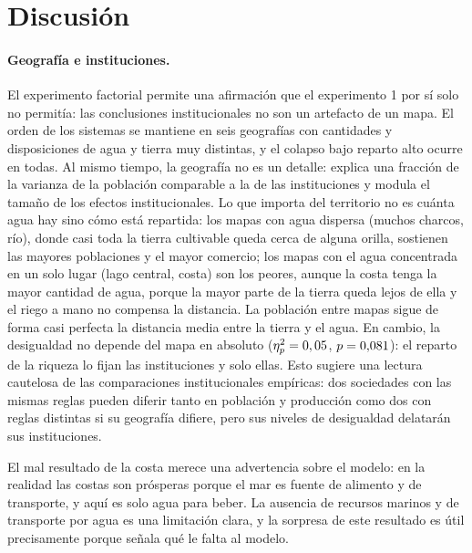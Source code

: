 \documentclass[11pt,a4paper]{article}
\begin{document}
\begin{table}[htbp]\centering\small
\caption{Contrastes clave repetidos en cada mapa ($d$ de Cohen y prueba t de Welch, \nRepMapas{} réplicas por sistema y mapa).}\label{tab:contrastes-mapas}
\resizebox{\textwidth}{!}{}
\end{table}

\section{Discusión}
\paragraph{Geografía e instituciones.} El experimento factorial permite una afirmación que el experimento 1 por sí solo no permitía: las conclusiones institucionales no son un artefacto de un mapa. El orden de los sistemas se mantiene en seis geografías con cantidades y disposiciones de agua y tierra muy distintas, y el colapso bajo reparto alto ocurre en todas. Al mismo tiempo, la geografía no es un detalle: explica una fracción de la varianza de la población comparable a la de las instituciones y modula el tamaño de los efectos institucionales. Lo que importa del territorio no es cuánta agua hay sino cómo está repartida: los mapas con agua dispersa (muchos charcos, río), donde casi toda la tierra cultivable queda cerca de alguna orilla, sostienen las mayores poblaciones y el mayor comercio; los mapas con el agua concentrada en un solo lugar (lago central, costa) son los peores, aunque la costa tenga la mayor cantidad de agua, porque la mayor parte de la tierra queda lejos de ella y el riego a mano no compensa la distancia. La población entre mapas sigue de forma casi perfecta la distancia media entre la tierra y el agua. En cambio, la desigualdad no depende del mapa en absoluto ($\eta^2_p=0,05$, $p=0{,}081$): el reparto de la riqueza lo fijan las instituciones y solo ellas. Esto sugiere una lectura cautelosa de las comparaciones institucionales empíricas: dos sociedades con las mismas reglas pueden diferir tanto en población y producción como dos con reglas distintas si su geografía difiere, pero sus niveles de desigualdad delatarán sus instituciones.

El mal resultado de la costa merece una advertencia sobre el modelo: en la realidad las costas son prósperas porque el mar es fuente de alimento y de transporte, y aquí es solo agua para beber. La ausencia de recursos marinos y de transporte por agua es una limitación clara, y la sorpresa de este resultado es útil precisamente porque señala qué le falta al modelo.
\end{document}
